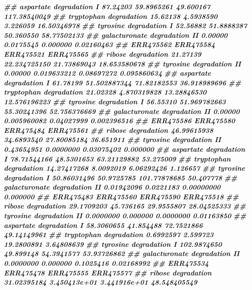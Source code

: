 \documentclass[
]{article}
\newenvironment{Shaded}{\begin{snugshade}}{\end{snugshade}}
\newcommand{\DocumentationTok}[1]{\textcolor[rgb]{0.56,0.35,0.01}{\textbf{\textit{#1}}}}
\begin{document}
\begin{Shaded}
\begin{Highlighting}[]
\DocumentationTok{\#\# aspartate degradation I       87.24203 59.8965261 49.600167 117.38540049}
\DocumentationTok{\#\# tryptophan degradation        15.62138  4.5938590  3.226059  16.50346978}
\DocumentationTok{\#\# tyrosine degradation I        52.56882 51.8888387 50.360550  58.77502133}
\DocumentationTok{\#\# galacturonate degradation II   0.00000  0.0175545  0.000000   0.02160463}
\DocumentationTok{\#\#                              ERR475562    ERR475584   ERR475521    ERR475565}
\DocumentationTok{\#\# ribose degradation            21.27139 22.234725150 21.73869043 18.653580678}
\DocumentationTok{\#\# tyrosine degradation II        0.00000  0.019633212  0.08697272  0.095860634}
\DocumentationTok{\#\# aspartate degradation I       61.78199 51.502887344 71.82182553 36.918989696}
\DocumentationTok{\#\# tryptophan degradation        21.02328  4.870319828 13.28846530 12.576196223}
\DocumentationTok{\#\# tyrosine degradation I        56.55310 51.969782663 55.30241396 52.756376669}
\DocumentationTok{\#\# galacturonate degradation II   0.00000  0.005960082  0.04027999  0.002396516}
\DocumentationTok{\#\#                                ERR475586  ERR475580    ERR475484 ERR475561}
\DocumentationTok{\#\# ribose degradation           46.99615938 34.6893540  27.80085184 36.651911}
\DocumentationTok{\#\# tyrosine degradation II       0.43654951  0.0000000   0.03075402  0.000000}
\DocumentationTok{\#\# aspartate degradation I      78.71544166 48.5301653  63.21129882 53.275009}
\DocumentationTok{\#\# tryptophan degradation       14.27417268  8.0092019   6.06292426  1.126657}
\DocumentationTok{\#\# tyrosine degradation I       50.86031496 50.9725785 101.77878685 50.407778}
\DocumentationTok{\#\# galacturonate degradation II  0.01942096  0.0221183   0.00000000  0.000000}
\DocumentationTok{\#\#                                ERR475483 ERR475560  ERR475590   ERR475518}
\DocumentationTok{\#\# ribose degradation            29.1709203 45.736165 29.9555807 28.04525333}
\DocumentationTok{\#\# tyrosine degradation II        0.0000000  0.000000  0.0000000  0.01163850}
\DocumentationTok{\#\# aspartate degradation I       58.3060655 41.854488 72.7521866 49.14149961}
\DocumentationTok{\#\# tryptophan degradation         0.6992597  2.599723 19.2800891  3.64808639}
\DocumentationTok{\#\# tyrosine degradation I       102.9874650 49.899148 54.3941577 53.93726862}
\DocumentationTok{\#\# galacturonate degradation II   0.0000000  0.000000  0.1025416  0.02168992}
\DocumentationTok{\#\#                                ERR475534    ERR475478    ERR475555    ERR475577}
\DocumentationTok{\#\# ribose degradation           31.02395184 3.450413e+01 3.441916e+01 48.548405549}

\end{Highlighting}
\end{Shaded}
\end{document}

